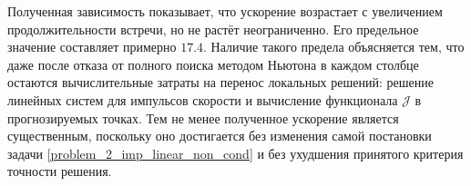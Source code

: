 Полученная зависимость показывает, что ускорение возрастает с увеличением продолжительности встречи, но не растёт неограниченно. Его предельное значение составляет примерно $17.4$. Наличие такого предела объясняется тем, что даже после отказа от полного поиска методом Ньютона в каждом столбце остаются вычислительные затраты на перенос локальных решений: решение линейных систем для импульсов скорости и вычисление функционала $\mathcal{J}$ в прогнозируемых точках. Тем не менее полученное ускорение является существенным, поскольку оно достигается без изменения самой постановки задачи \eqref{problem_2_imp_linear_non_cond} и без ухудшения принятого критерия точности решения.


